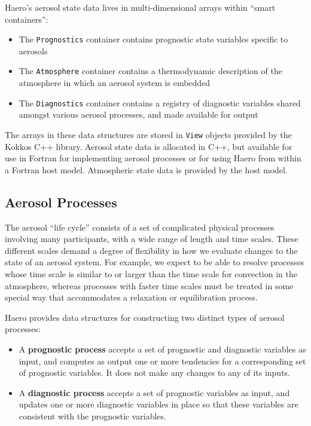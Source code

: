 Haero's aerosol state data lives in multi-dimensional arrays within ``smart
containers'':

\begin{itemize}
  \item The \texttt{Prognostics} container contains prognostic state variables
        specific to aerosols
  \item The \texttt{Atmosphere} container contains a thermodynamic description
        of the atmosphere in which an aerosol system is embedded
  \item The \texttt{Diagnostics} container contains a registry of diagnostic
        variables shared amongst various aerosol processes, and made available
        for output
\end{itemize}

The arrays in these data structures are stored in \texttt{View} objects provided
by the Kokkos C++ library. Aerosol state data is allocated in C++, but available
for use in Fortran for implementing aerosol processes or for using Haero
from within a Fortran host model. Atmospheric state data is provided by the
host model.

\subsection{Aerosol Processes}

The aerosol ``life cycle'' consists of a set of complicated physical processes
involving many participants, with a wide range of length and time scales. These
different scales demand a degree of flexibility in how we evaluate changes to
the state of an aerosol system. For example, we expect to be able to resolve
processes whose time scale is similar to or larger than the time scale for
convection in the atmosphere, whereas processes with faster time scales must be
treated in some special way that accommodates a relaxation or equilibration
process.

Haero provides data structures for constructing two distinct types of aerosol
processes:

\begin{itemize}
  \item A {\bf prognostic process} accepts a set of prognostic and diagnostic
        variables as input, and computes as output one or more tendencies for a
        corresponding set of prognostic variables. It does not make any changes
        to any of its inputs.
  \item A {\bf diagnostic process} accepts a set of prognostic variables as
        input, and updates one or more diagnostic variables in place so that
        these variables are consistent with the prognostic variables.
\end{itemize}

